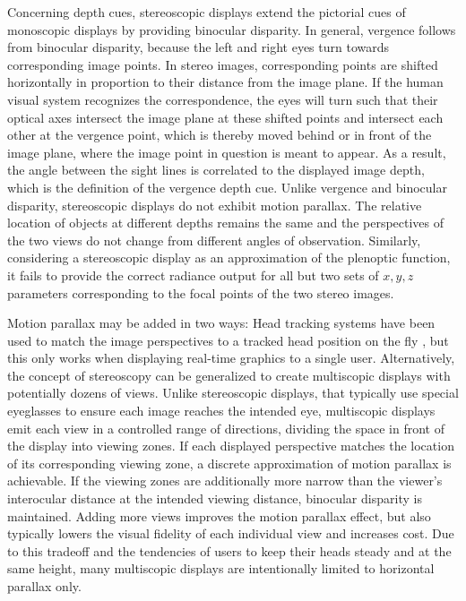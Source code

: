 Concerning depth cues, stereoscopic displays extend the pictorial cues of monoscopic displays by providing binocular disparity. In general, vergence follows from binocular disparity, because the left and right eyes turn towards corresponding image points. In stereo images, corresponding points are shifted horizontally in proportion to their distance from the image plane. If the human visual system recognizes the correspondence, the eyes will turn such that their optical axes intersect the image plane at these shifted points and intersect each other at the vergence point, which is thereby moved behind or in front of the image plane, where the image point in question is meant to appear. As a result, the angle between the sight lines is correlated to the displayed image depth, which is the definition of the vergence depth cue. Unlike vergence and binocular disparity, stereoscopic displays do not exhibit motion parallax. The relative location of objects at different depths remains the same and the perspectives of the two views do not change from different angles of observation. Similarly, considering a stereoscopic display as an approximation of the plenoptic function, it fails to provide the correct radiance output for all but two sets of $x, y, z$ parameters corresponding to the focal points of the two stereo images.

Motion parallax may be added in two ways: Head tracking systems have been used to match the image perspectives to a tracked head position on the fly \cite{Woodgate_Ezra_Harrold_Holliman_Jones_Moseley_1997, Hentschke_2010}, but this only works when displaying real-time graphics to a single user. Alternatively, the concept of stereoscopy can be generalized to create multiscopic displays with potentially dozens of views. Unlike stereoscopic displays, that typically use special eyeglasses to ensure each image reaches the intended eye, multiscopic displays emit each view in a controlled range of directions, dividing the space in front of the display into viewing zones. If each displayed perspective matches the location of its corresponding viewing zone, a discrete approximation of motion parallax is achievable. If the viewing zones are additionally more narrow than the viewer's interocular distance at the intended viewing distance, binocular disparity is maintained. Adding more views improves the motion parallax effect, but also typically lowers the visual fidelity of each individual view and increases cost. Due to this tradeoff and the tendencies of users to keep their heads steady and at the same height, many multiscopic displays are intentionally limited to horizontal parallax only.

